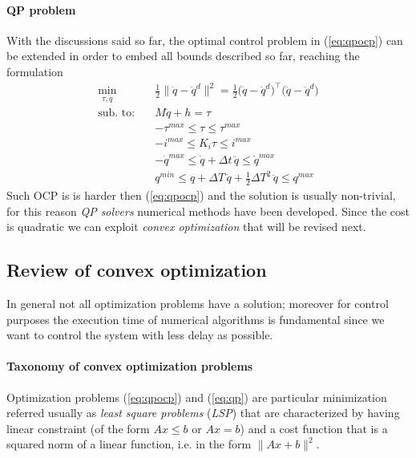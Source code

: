 	\paragraph{QP problem} With the discussions said so far, the optimal control problem in (\ref{eq:qpocp}) can be extended in order to embed all bounds described so far, reaching the formulation
	\begin{equation} \label{eq:qp}
		\begin{split}
			\min_{\tau, \ddot q}\quad & \frac 1 2 \big\|\ddot q - \ddot q^d \big\|^2 = \frac 1 2 \big(\ddot q - \ddot q^d\big)^\top \big(\ddot q - \ddot q^d\big) \\
			\textrm{sub. to:}\quad & M \ddot q + h = \tau \\
			& -\tau^{max} \leq \tau \leq \tau^{max} \\
			& -i^{max} \leq K_i \tau \leq i^{max} \\
			& -\dot q^{max} \leq \dot q + \Delta t \, \ddot q \leq \dot q^{max} \\
			& q^{min} \leq q + \Delta T\, \dot q + \frac 1 2 \Delta T^2 \, \ddot q \leq q^{max}
		\end{split}
	\end{equation}
	Such OCP is is harder then (\ref{eq:qpocp}) and the solution is usually non-trivial, for this reason \textit{QP solvers} numerical methods have been developed. Since the cost is quadratic we can exploit \textit{convex optimization} that will be revised next.
	
\subsection{Review of convex optimization} \label{sec:qp}
	In general not all optimization problems have a solution; moreover for control purposes the execution time of numerical algorithms is fundamental since we want to control the system with less delay as possible.
	
	\paragraph{Taxonomy of convex optimization problems} Optimization problems (\ref{eq:qpocp}) and (\ref{eq:qp}) are particular minimization referred usually as \textit{least square problems} (\textit{LSP}) that are characterized by having linear constraint (of the form $Ax\leq b$ or $Ax = b$) and a cost function that is a squared norm of a linear function, i.e. in the form $\|Ax + b\|^2$.
	
